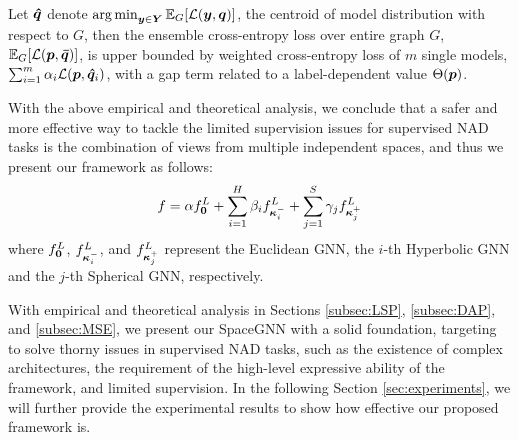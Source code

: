 \begin{proposition}
    \label{thm:expectation}
Let $\boldsymbol{\hat{q}}$ denote $\operatorname*{arg\,min}_{\boldsymbol{y}\in\boldsymbol{Y}}\mathbb{E}_G[\mathcal{L}(\boldsymbol{y}, \boldsymbol{q})]$, the centroid of model distribution with respect to $G$, then the ensemble cross-entropy loss over entire graph $G$, $\mathbb{E}_G[\mathcal{L}(\boldsymbol{p}, \boldsymbol{\bar{q}})]$, is upper bounded by weighted cross-entropy loss of $m$ single models, $\sum_{i=1}^m\alpha_i\mathcal{L}(\boldsymbol{p}, \boldsymbol{\hat{q}}_i)$, with a gap term related to a label-dependent value $\Theta(\boldsymbol{p})$. 
\end{proposition}


With the above empirical and theoretical analysis, we conclude that a safer and more effective way to tackle the limited supervision issues for supervised NAD tasks is the combination of views from multiple independent spaces, and thus we present our framework as follows: 
\begin{equation}\label{eqn:ensemble}
\begin{aligned}
    f=\alpha f_{\boldsymbol{0}}^L+\sum_{i=1}^H\beta_i f_{\boldsymbol{\kappa}^-_i}^{L}+\sum_{j=1}^S\gamma_j f_{\boldsymbol{\kappa}^+_j}^{L}
\end{aligned}
\end{equation}
where $f_{\boldsymbol{0}}^L$, $f_{\boldsymbol{\kappa}^-_i}^{L}$, and $f_{\boldsymbol{\kappa}^+_j}^{L}$ represent the Euclidean GNN, the $i$-th Hyperbolic GNN and the $j$-th Spherical GNN, respectively. 

With empirical and theoretical analysis in Sections \ref{subsec:LSP}, \ref{subsec:DAP}, and \ref{subsec:MSE}, we present our SpaceGNN with a solid foundation, targeting to solve thorny issues in supervised NAD tasks, such as the existence of complex architectures, the requirement of the high-level expressive ability of the framework, and limited supervision. In the following Section \ref{sec:experiments}, we will further provide the experimental results to show how effective our proposed framework is. 